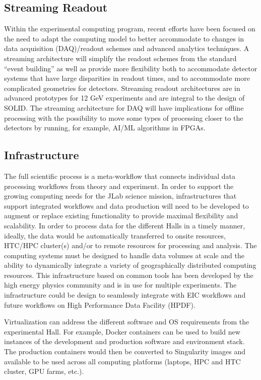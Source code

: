 \subsection{Streaming Readout}

Within the experimental computing program, recent efforts have been focused on the need to adapt the computing model to better accommodate to changes in data acquisition (DAQ)/readout schemes and advanced analytics techniques. A streaming architecture will simplify the readout schemes from the standard “event building” as well as provide more flexibility both to accommodate detector systems that have large disparities in readout times, and to accommodate more complicated geometries for detectors. Streaming readout architectures are in advanced prototypes for 12 GeV experiments and are integral to the design of SOLID. The streaming architecture for DAQ will have implications for offline processing with the possibility to move some types of processing closer to the detectors by running, for example, AI/ML algorithms in FPGAs.


\subsection{Infrastructure}
The full scientific process is a meta-workflow that connects individual data processing workflows from theory and experiment.
In order to support the growing computing needs for the JLab science mission, infrastructures that support integrated workflows and data production will need to be developed to augment or replace existing functionality to provide maximal flexibility and scalability. In order to process data for the different Halls in a timely manner, ideally, the data would be automatically transferred to onsite resources, HTC/HPC cluster(s) and/or to remote resources for processing and analysis. The computing systems must be designed to handle data volumes at scale and the ability to dynamically integrate a variety of geographically distributed computing resources. This infrastructure based on common tools has been developed by the high energy physics community and is in use for multiple experiments.
The infrastructure could be design to seamlessly integrate with EIC workflows and future workflows on High Performance Data Facility (HPDF).

Virtualization can address the different software and OS requirements from the experimental Hall.  For example, Docker containers can be used to build new instances of the development and production software and environment stack. The production containers would then be converted to Singularity images and available to be used across all computing platforms (laptops, HPC  and HTC cluster, GPU farms, etc.). 



